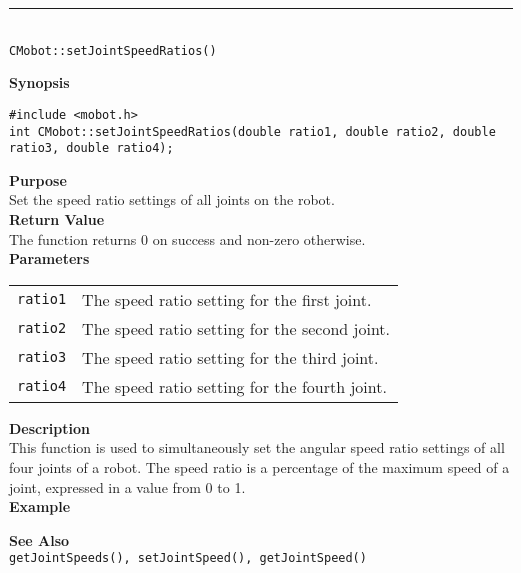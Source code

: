 \noindent
\vspace{5pt}
\rule{4.5in}{0.015in}\\
\noindent
{\LARGE \texttt{CMobot::setJointSpeedRatios()}}\\
{}

\noindent
{\bf Synopsis}
\vspace{-8pt}
\begin{verbatim}
#include <mobot.h>
int CMobot::setJointSpeedRatios(double ratio1, double ratio2, double ratio3, double ratio4);
\end{verbatim}

\noindent
{\bf Purpose}\\
Set the speed ratio settings of all joints on the robot.\\

\noindent
{\bf Return Value}\\
The function returns 0 on success and non-zero otherwise.\\

\noindent
{\bf Parameters}
\vspace{-0.1in}
\begin{description}
\item               
\begin{tabular}{p{10 mm}p{145 mm}}
\texttt{ratio1} & The speed ratio setting for the first joint. \\ 
\texttt{ratio2} & The speed ratio setting for the second joint. \\
\texttt{ratio3} & The speed ratio setting for the third joint. \\
\texttt{ratio4} & The speed ratio setting for the fourth joint. \\
\end{tabular}
\end{description}

\noindent
{\bf Description}\\
This function is used to simultaneously set the angular speed ratio settings of
all four joints of a robot. The speed ratio is a percentage of the maximum
speed of a joint, expressed in a value from 0 to 1.\\

\noindent
{\bf Example}\\
\noindent

\noindent
{\bf See Also}\\
\texttt{getJointSpeeds(), setJointSpeed(), getJointSpeed()}

